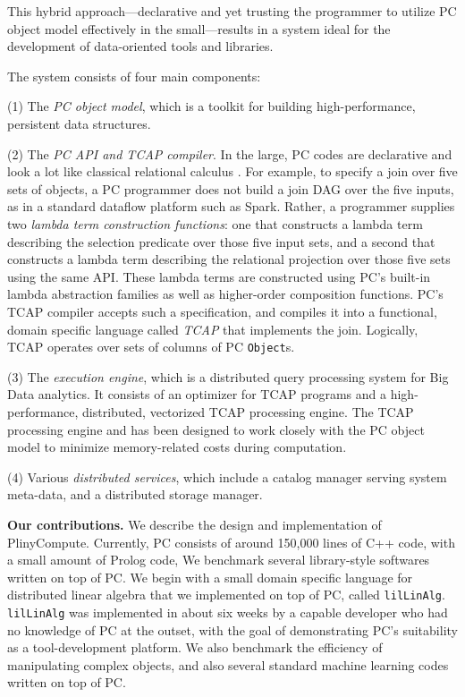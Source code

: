 This hybrid approach---declarative and yet trusting the programmer
to utilize PC object model effectively
in the small---results in a system ideal for the 
development of data-oriented tools and libraries.

The system consists of four main components: 

\vspace{3pt}
\noindent
(1) The \emph{PC object model}, which is a toolkit for building high-performance, persistent data structures.

\vspace {3pt}
\noindent
(2) The \emph{PC API and TCAP compiler}.  In the large, PC codes are declarative and look a lot like classical relational calculus \cite{codd1971data}.  For example, to specify a join over five sets of objects, a PC programmer does not build a join DAG over the five inputs, as in a standard
dataflow platform such as Spark.  Rather, a programmer 
supplies two \emph{lambda term construction functions}: one that constructs a lambda term describing the selection
predicate over those five input sets, 
and a second that constructs a lambda term describing the relational projection over those five sets
using the same API.  These lambda terms are constructed using PC's built-in lambda abstraction families as well as higher-order composition functions.
 PC's TCAP compiler 
accepts such a specification, and compiles it into a functional, domain specific language called \emph{TCAP} that implements
the join.  Logically, TCAP operates over
sets of columns of PC \texttt{Object}s. 

\vspace{3pt}
\noindent
(3) The \emph{execution engine}, which is a distributed query processing
  system for Big Data analytics.
  It consists of an optimizer for TCAP
  programs and a 
high-performance, distributed, vectorized TCAP processing engine. 
The TCAP processing engine 
and has been designed to work closely with the PC object model to
minimize memory-related costs during computation.

\vspace{3pt}
\noindent
(4) Various \emph{distributed services}, which include 
a catalog manager serving system meta-data, and a
distributed storage manager.



\vspace{8 pt}
\noindent
\textbf{Our contributions.}
We describe the design and implementation of PlinyCompute.  
Currently, PC consists of around
150,000 lines of C++ code, with a small amount of Prolog code,
We benchmark several library-style softwares written on top of PC.  We begin with a small domain specific language
for distributed linear algebra that we implemented on top of PC,
called \texttt{lilLinAlg}.  \texttt{lilLinAlg} was implemented in
about six weeks by a capable developer
who had no knowledge of PC at the outset, with the goal of demonstrating PC's suitability as a tool-development platform.  
We also benchmark the efficiency of manipulating complex objects, and also several standard machine learning codes written on top of PC.

